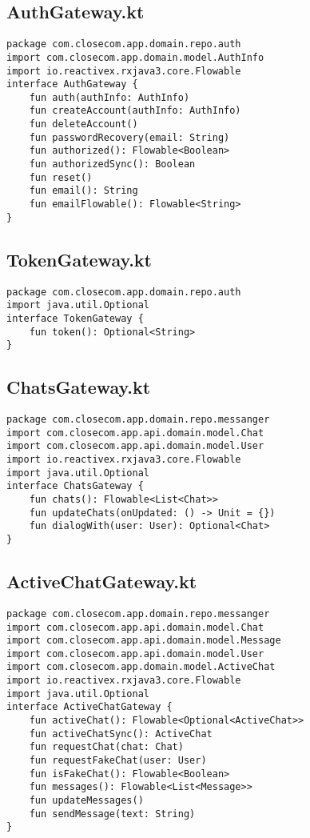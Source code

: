 \documentclass[listing]{espd}
\begin{document}
\subsection{AuthGateway.kt}
\begin{verbatim}
package com.closecom.app.domain.repo.auth
import com.closecom.app.domain.model.AuthInfo
import io.reactivex.rxjava3.core.Flowable
interface AuthGateway {
    fun auth(authInfo: AuthInfo)
    fun createAccount(authInfo: AuthInfo)
    fun deleteAccount()
    fun passwordRecovery(email: String)
    fun authorized(): Flowable<Boolean>
    fun authorizedSync(): Boolean
    fun reset()
    fun email(): String
    fun emailFlowable(): Flowable<String>
}
\end{verbatim}

\subsection{TokenGateway.kt}
\begin{verbatim}
package com.closecom.app.domain.repo.auth
import java.util.Optional
interface TokenGateway {
    fun token(): Optional<String>
}
\end{verbatim}

\subsection{ChatsGateway.kt}
\begin{verbatim}
package com.closecom.app.domain.repo.messanger
import com.closecom.app.api.domain.model.Chat
import com.closecom.app.api.domain.model.User
import io.reactivex.rxjava3.core.Flowable
import java.util.Optional
interface ChatsGateway {
    fun chats(): Flowable<List<Chat>>
    fun updateChats(onUpdated: () -> Unit = {})
    fun dialogWith(user: User): Optional<Chat>
}
\end{verbatim}

\subsection{ActiveChatGateway.kt}
\begin{verbatim}
package com.closecom.app.domain.repo.messanger
import com.closecom.app.api.domain.model.Chat
import com.closecom.app.api.domain.model.Message
import com.closecom.app.api.domain.model.User
import com.closecom.app.domain.model.ActiveChat
import io.reactivex.rxjava3.core.Flowable
import java.util.Optional
interface ActiveChatGateway {
    fun activeChat(): Flowable<Optional<ActiveChat>>
    fun activeChatSync(): ActiveChat
    fun requestChat(chat: Chat)
    fun requestFakeChat(user: User)
    fun isFakeChat(): Flowable<Boolean>
    fun messages(): Flowable<List<Message>>
    fun updateMessages()
    fun sendMessage(text: String)
}
\end{verbatim}
\end{document}
